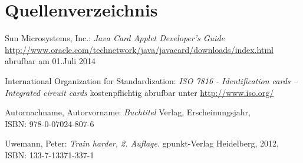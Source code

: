\documentclass[a4paper,12pt]{scrartcl}
\begin{document}
\section{Quellenverzeichnis}
\label{sec:6}
\renewcommand\refname{Quellenverzeichnis}
\begin{thebibliography}{999}

Sun Microsystems, Inc.:  {\sl Java Card Applet Developer's Guide}\\
\url{http://www.oracle.com/technetwork/java/javacard/downloads/index.html}\\
abrufbar am 01.Juli 2014

International Organization for Standardization: {\sl ISO 7816 - Identification cards -- Integrated circuit cards}
kostenpflichtig abrufbar unter \url{http://www.iso.org/}

Autornachname, Autorvorname:  {\sl Buchtitel} Verlag, Erscheinungsjahr,
\\ISBN:  978-0-07024-807-6

Uwemann, Peter:  {\sl Train harder, 2. Auflage}. gpunkt-Verlag Heidelberg, 2012,
\\ISBN: 133-7-13371-337-1


\end{thebibliography}
\end{document}
